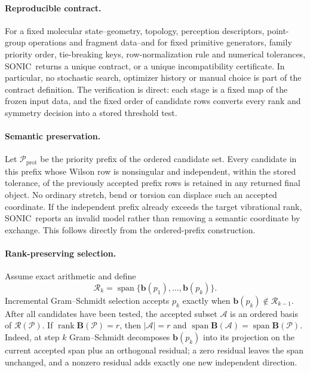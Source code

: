 \documentclass[journal=jctcce,manuscript=article,layout=traditional]{achemso}
\newcommand{\SONIC}{SONIC}
\newcommand{\Bmat}{\mathbf{B}}
\newcommand{\bmat}{\mathbf{b}}
\theoremstyle{definition}
\begin{document}
\paragraph{Reproducible contract.}
\label{prop:determinism}
For a fixed molecular state--geometry, topology, perception descriptors, point-group
operations and fragment data--and for fixed primitive generators, family
priority order, tie-breaking keys, row-normalization rule and numerical
tolerances, \SONIC\ returns a unique contract, or a unique
incompatibility certificate.  In particular, no stochastic search, optimizer
history or manual choice is part of the contract definition.
The verification is direct: each stage is a fixed map of the frozen
input data, and the fixed order of candidate rows converts every rank and
symmetry decision into a stored threshold test.

\paragraph{Semantic preservation.}
\label{prop:protected}
Let \(\mathcal{P}_{\mathrm{prot}}\) be the priority prefix of the ordered
candidate set.  Every candidate in this prefix whose Wilson row is nonsingular
and independent, within the stored tolerance, of the previously accepted prefix
rows is retained in any returned final object.  No ordinary stretch, bend or
torsion can displace such an accepted coordinate.  If the independent prefix
already exceeds the target vibrational rank, \SONIC\ reports an invalid model
rather than removing a semantic coordinate by exchange.  This follows directly
from the ordered-prefix construction.

\paragraph{Rank-preserving selection.}
\label{prop:rank-selection}
Assume exact arithmetic and define
\[
  \mathcal{R}_k=\operatorname{span}\{\bmat(p_1),\ldots,\bmat(p_k)\}.
\]
Incremental Gram--Schmidt selection accepts \(p_k\) exactly when
\(\bmat(p_k)\notin\mathcal{R}_{k-1}\).  After all candidates have been tested,
the accepted subset \(\mathcal{A}\) is an ordered basis of
\(\mathcal{R}(\mathcal{P})\).  If
\(\operatorname{rank}\Bmat(\mathcal{P})=r\), then
\(|\mathcal{A}|=r\) and
\(\operatorname{span}\Bmat(\mathcal{A})=\operatorname{span}\Bmat(\mathcal{P})\).
Indeed, at step \(k\) Gram--Schmidt decomposes \(\bmat(p_k)\) into its
projection on the current accepted span plus an orthogonal residual; a zero
residual leaves the span unchanged, and a nonzero residual adds exactly one
new independent direction.
\end{document}
